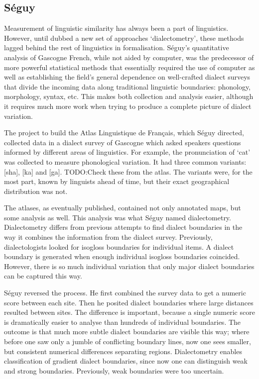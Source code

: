 \documentclass[11pt]{article}
\begin{document}
\subsection{S\'eguy}
Measurement of linguistic similarity has always been a part of
linguistics. However, until  dubbed a new set of
approaches `dialectometry', these methods lagged behind the rest of
linguistics in formalisation. S\'eguy's quantitative analysis
of Gascogne French, while not aided by computer, was the predecessor
of more powerful statistical methods that essentially required the use
of computer as well as establishing the field's general dependence on
well-crafted dialect surveys that divide the incoming data along
traditional linguistic boundaries: phonology, morphology, syntax, etc.
This makes both collection and analysis easier, although it requires
much more work when trying to produce a complete picture of dialect
variation.

The project to build the Atlas Linguistique de Fran\c{c}ais, which
S\'eguy directed, collected data in a dialect survey of Gascogne which
asked speakers questions informed by different areas of
linguistics. For example, the pronunciation of `cat' was collected to
measure phonological variation. It had three common variants: [sha],
[ka] and [ga]. TODO:Check these from the atlas. The variants were,
for the most part, known by linguists ahead of time, but their exact
geographical distribution was not.

The atlases, as eventually published, contained not only annotated
maps, but some analysis as well. This analysis was what S\'eguy named
dialectometry. Dialectometry differs from previous attempts to find
dialect boundaries in the way it combines the information from the
dialect survey. Previously, dialectologists looked for isogloss
boundaries for individual items. A dialect boundary is generated when
enough individual isogloss boundaries coincided. However, there is so
much individual variation that only major dialect boundaries can
be captured this way.

S\'eguy reversed the process. He first combined the survey data to get
a numeric score between each site. Then he posited dialect boundaries
where large distances resulted between sites. The difference is
important, because a single numeric score is dramatically easier to
analyse than hundreds of individual boundaries. The outcome is that
much more subtle dialect boundaries are visible this way; where before
one saw only a jumble of conflicting boundary lines, now one sees
smaller, but consistent numerical differences separating regions. {Dialectometry
  enables classification of gradient dialect boundaries, since now one
can distinguish weak and strong boundaries. Previously, weak
boundaries were too uncertain.}
\end{document}
